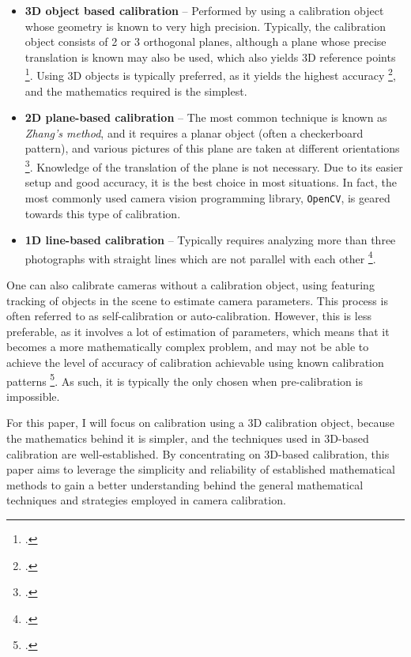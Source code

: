 \begin{itemize}[leftmargin=!, itemindent=-4ex]
    \item \textbf{3D object based calibration} -- Performed by using a calibration object whose geometry is known to very high precision. Typically, the calibration object consists of 2 or 3 orthogonal planes, although a plane whose precise translation is known may also be used, which also yields 3D reference points \footcite{zhangCameraCalibration2007}. Using 3D objects is typically preferred, as it yields the highest accuracy \footcite{zhangCameraCalibration2007}, and the mathematics required is the simplest.
    \item \textbf{2D plane-based calibration} -- The most common technique is known as \emph{Zhang's method}, and it requires a planar object (often a checkerboard pattern), and various pictures of this plane are taken at different orientations \footcite{zhangFlexibleNew2000}. Knowledge of the translation of the plane is not necessary. Due to its easier setup and good accuracy, it is the best choice in most situations. In fact, the most commonly used camera vision programming library, \texttt{OpenCV}, is geared towards this type of calibration. 
    \item \textbf{1D line-based calibration} -- Typically requires analyzing more than three photographs with straight lines which are not parallel with each other \footcite{chuLineBasedCamera2005}. 
\end{itemize}

One can also calibrate cameras without a calibration object, using featuring tracking of objects in the scene to estimate camera parameters. This process is often referred to as self-calibration or auto-calibration. However, this is less preferable, as it involves a lot of estimation of parameters, which means that it becomes a more mathematically complex problem, and may not be able to achieve the level of accuracy of calibration achievable using known calibration patterns \footcite{zhangCameraCalibration2007}. As such, it is typically the only chosen when pre-calibration is impossible. 

For this paper, I will focus on calibration using a 3D calibration object, because the mathematics behind it is simpler, and the techniques used in 3D-based calibration are well-established. By concentrating on 3D-based calibration, this paper aims to leverage the simplicity and reliability of established mathematical methods to gain a better understanding behind the general mathematical techniques and strategies employed in camera calibration.
